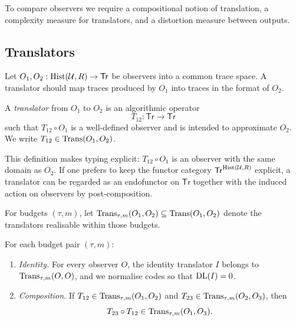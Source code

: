 \documentclass{aion}
\newcommand{\Tr}{\mathsf{Tr}}
\begin{document}
To compare observers we require a compositional notion of translation, a complexity measure for translators,
and a distortion measure between outputs.

\subsection{Translators}
\label{subsec:translators-def}

Let $O_1,O_2:\Hist(\mathcal{U},R)\to\Tr$ be observers into a common trace space.
A translator should map traces produced by $O_1$ into traces in the format of $O_2$.

\begin{definition}[Translator]\label{def:translator}
A \emph{translator} from $O_1$ to $O_2$ is an algorithmic operator
\[
  T_{12} : \Tr \to \Tr
\]
such that $T_{12}\circ O_1$ is a well-defined observer and is intended to approximate $O_2$.
We write $T_{12}\in\operatorname{Trans}(O_1,O_2)$.
\end{definition}

\begin{remark}
This definition makes typing explicit: $T_{12}\circ O_1$ is an observer with the same domain as $O_2$.
If one prefers to keep the functor category $\Tr^{\Hist(\mathcal{U},R)}$ explicit, a translator can be regarded as an endofunctor
on $\Tr$ together with the induced action on observers by post-composition.
\end{remark}

\begin{definition}\label{def:budgeted-trans}
For budgets $(\tau,m)$, let $\operatorname{Trans}_{\tau,m}(O_1,O_2)\subseteq\operatorname{Trans}(O_1,O_2)$ denote the translators
realisable within those budgets.
\end{definition}

\begin{assumption}\label{ass:budgeted-trans}
For each budget pair $(\tau,m)$:
\begin{enumerate}[leftmargin=*]
  \item \emph{Identity.} For every observer $O$, the identity translator $I$ belongs to $\operatorname{Trans}_{\tau,m}(O,O)$, and we normalise
        codes so that $\operatorname{DL}(I)=0$.
  \item \emph{Composition.} If $T_{12}\in\operatorname{Trans}_{\tau,m}(O_1,O_2)$ and $T_{23}\in\operatorname{Trans}_{\tau,m}(O_2,O_3)$, then
        \[
          T_{23}\circ T_{12}\in\operatorname{Trans}_{\tau,m}(O_1,O_3).
        \]
\end{enumerate}
\end{assumption}
\end{document}
